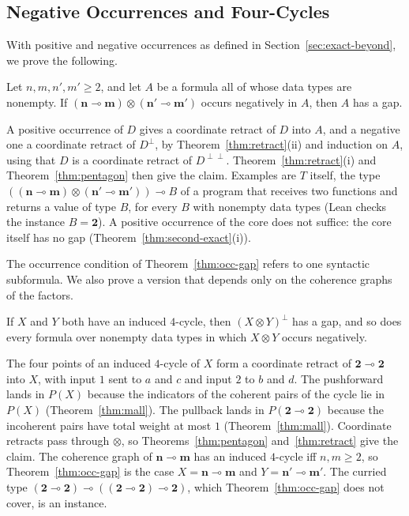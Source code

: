\subsection{Negative Occurrences and Four-Cycles}
\label{sec:other-occ}

With positive and negative occurrences as defined in
Section~\ref{sec:exact-beyond}, we prove the following.

\begin{theorem}
\label{thm:occ-gap}
Let $n, m, n', m' \ge 2$, and let $A$ be a formula all of whose data types
are nonempty. If $(\mathbf{n} \multimap \mathbf{m}) \otimes
(\mathbf{n'} \multimap \mathbf{m'})$ occurs negatively in $A$, then $A$
has a gap.
\end{theorem}

\noindent
A positive occurrence of $D$ gives a coordinate retract of $D$ into $A$,
and a negative one a coordinate retract of $D^{\perp}$, by
Theorem~\ref{thm:retract}(ii) and induction on $A$, using that $D$ is a
coordinate retract of $D^{\perp\perp}$. Theorem~\ref{thm:retract}(i) and
Theorem~\ref{thm:pentagon} then give the claim. Examples are $T$ itself,
the type $((\mathbf{n} \multimap \mathbf{m}) \otimes (\mathbf{n'}
\multimap \mathbf{m'})) \multimap B$ of a program that receives two
functions and returns a value of type $B$, for every $B$ with nonempty
data types (Lean checks the instance $B = \mathbf{2}$). A positive occurrence of the core
does not suffice: the core itself has no gap
(Theorem~\ref{thm:second-exact}(i)).

The occurrence condition of Theorem~\ref{thm:occ-gap} refers to one
syntactic subformula. We also prove a version that depends only on the
coherence graphs of the factors.

\begin{theorem}
\label{thm:c4}
If $X$ and $Y$ both have an induced $4$-cycle, then
$(X \otimes Y)^{\perp}$ has a gap, and so does every formula over
nonempty data types in which $X \otimes Y$ occurs negatively.
\end{theorem}

\noindent
The four points of an induced $4$-cycle of $X$ form a coordinate retract of
$\mathbf{2} \multimap \mathbf{2}$ into $X$, with input $1$ sent to $a$ and
$c$ and input $2$ to $b$ and $d$. The pushforward lands in $P(X)$ because
the indicators of the coherent pairs of the cycle lie in $P(X)$ (Theorem~\ref{thm:mall}). The pullback lands in
$P(\mathbf{2} \multimap \mathbf{2})$ because the incoherent pairs have
total weight at most $1$ (Theorem~\ref{thm:mall}). Coordinate retracts
pass through $\otimes$, so Theorems~\ref{thm:pentagon}
and~\ref{thm:retract} give the claim. The coherence graph of
$\mathbf{n} \multimap \mathbf{m}$ has an induced $4$-cycle iff
$n, m \ge 2$, so Theorem~\ref{thm:occ-gap} is the case
$X = \mathbf{n} \multimap \mathbf{m}$ and
$Y = \mathbf{n'} \multimap \mathbf{m'}$. The curried type $(\mathbf{2} \multimap
\mathbf{2}) \multimap ((\mathbf{2} \multimap \mathbf{2}) \multimap
\mathbf{2})$, which Theorem~\ref{thm:occ-gap} does not cover, is an
instance.
